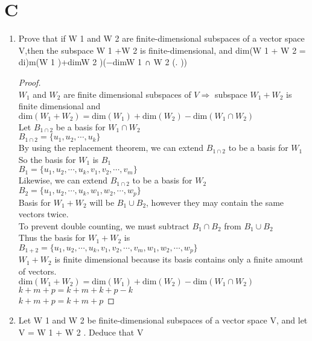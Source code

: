 \documentclass[11pt]{scrartcl}
\begin{document}
\section{C}
\begin{enumerate}[label=\alph*.]
	\item{
 Prove that if W 1 and W 2 are finite-dimensional subspaces of a vector space V,then the subspace W 1 +W 2 is
 finite-dimensional, and dim(W 1 + W 2  = di)m(W 1 )+dimW 2 )(−dimW 1 ∩ W 2 (. ))
			\begin{proof}
			\-\\
			$W_1$ and $W_2$ are finite dimensional subspaces of $V \Rightarrow $ subspace $W_1 + W_2$ is finite dimensional and $\text{dim}(W_1 + W_2) = \text{dim}(W_1) + \text{dim}(W_2) - \text{dim}(W_1 \cap W_2)$\\
			Let $B_{1\cap 2}$ be a basis for $W_1 \cap W_2$\\
			$B_{1\cap 2} = \{u_1, u_2, \cdots, u_k\}$\\
			By using the replacement theorem, we can extend $B_{1\cap 2}$ to be a basis for $W_1$\\
			So the basis for $W_1$ is $B_1$\\
			$B_1 = \{u_1, u_2, \cdots, u_k, v_1, v_2, \cdots, v_m\}$\\
			Likewise, we can extend $B_{1\cap 2}$ to be a basis for $W_2$\\
			$B_2 = \{u_1, u_2, \cdots, u_k, w_1, w_2, \cdots, w_p\}$\\
			Basis for $W_1 + W_2$ will be $B_1 \cup B_2$, however they may contain the same vectors twice.\\
			To prevent double counting, we must subtract $B_1 \cap B_2$ from $B_1 \cup B_2$\\
			Thus the basis for $W_1 + W_2$ is\\
			$B_{1+2} = \{u_1, u_2, \cdots, u_k, v_1, v_2, \cdots, v_m, w_1, w_2, \cdots, w_p\}$\\
			$W_1 + W_2$ is finite dimensional because its basis contains only a finite amount of vectors. \\
			$\text{dim}(W_1 + W_2) = \text{dim}(W_1) + \text{dim}(W_2) - \text{dim}(W_1 \cap W_2)$\\
			$k + m + p = k + m + k + p - k$\\
			$k + m + p = k + m + p$
			\end{proof}
		}
	\item{
			Let W 1 and W 2 be finite-dimensional subspaces of a vector space V, and let V = W 1 + W 2 . Deduce that V
}
\end{enumerate}
\end{document}

